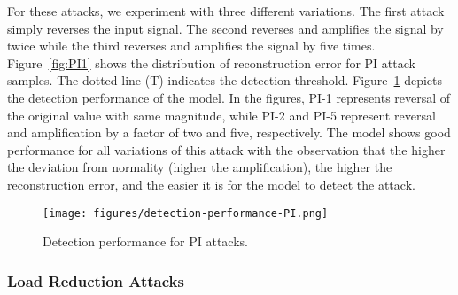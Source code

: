 For these attacks, we experiment with three different variations. The first attack simply reverses the input signal. The second reverses and amplifies the signal by twice while the third reverses and amplifies the signal by five times. Figure~\ref{fig:PI1} shows the distribution of reconstruction error for PI attack samples. The dotted line (T) indicates the detection threshold. Figure~\ref{fig:PI2} depicts the detection performance of the model. In the figures, PI-1 represents reversal of the original value with same magnitude, while PI-2 and PI-5 represent reversal and amplification by a factor of two and five, respectively. The model shows good performance for all variations of this attack with the observation that the higher the deviation from normality (higher the amplification), the higher the reconstruction error, and the easier it is for the model to detect the attack. 

\begin{figure}[htbp!] 
    \centering 
    \texttt{[image: figures/detection-performance-PI.png]}
    \caption{Detection performance for PI attacks.}
    \centering
    \label{fig:PI2}
\end{figure}

\iffalse
\begin{figure}[htbp!] 
    \centering 
    \texttt{[image: figures/confusion\_matrix\_PI-1.png]}
    \caption{Confusion matrix PI -1}
    \centering
    \label{fig:PI3}
\end{figure}


\begin{figure}[htbp!] 
    \centering 
    \texttt{[image: figures/confusion\_matrix\_PI-2.png]}
    \caption{Confusion matrix PI -2}
    \centering
    \label{fig:PI4}
\end{figure}
\begin{figure}[h!] 
    \centering 
    \texttt{[image: figures/confusion\_matrix\_PI-5.png]}
    \caption{Confusion matrix -5}
    \centering
    \label{fig:PI5}
\end{figure}
\fi

\subsubsection{Load Reduction Attacks}


